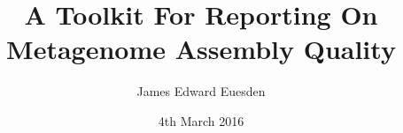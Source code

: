 
\title{A Toolkit For Reporting On Metagenome Assembly Quality}

\author{James Edward Euesden}




\date{4th March 2016} %




\maketitle



